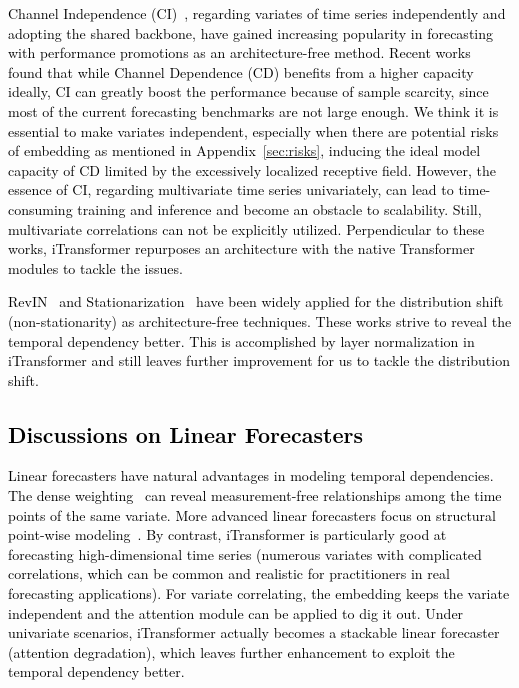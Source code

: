 \documentclass{article} %
\newcommand{\update}[1]{{\textcolor{black}{#1}}}
\begin{document}
\update{Channel Independence (CI)~\citep{PatchTST}, regarding variates of time series independently and adopting the shared backbone, have gained increasing popularity in forecasting with performance promotions as an architecture-free method. Recent works~\citep{han2023capacity, li2023revisiting} found that while Channel Dependence (CD) benefits from a higher capacity ideally, CI can greatly boost the performance because of sample scarcity, since most of the current forecasting benchmarks are not large enough. We think it is essential to make variates independent, especially when there are potential risks of embedding as mentioned in Appendix~\ref{sec:risks}, inducing the ideal model capacity of CD limited by the excessively localized receptive field. However, the essence of CI, regarding multivariate time series univariately, can lead to time-consuming training and inference and become an obstacle to scalability. Still, multivariate correlations can not be explicitly utilized. Perpendicular to these works, iTransformer repurposes an architecture with the native Transformer modules to tackle the issues.}

\update{RevIN~\citep{kim2021reversible} and Stationarization~\citep{Stationary} have been widely applied for the distribution shift (non-stationarity) as architecture-free techniques. These works strive to reveal the temporal dependency better. This is accomplished by layer normalization in iTransformer and still leaves further improvement for us to tackle the distribution shift.}

\subsection{\update{Discussions on Linear Forecasters}}
\update{Linear forecasters have natural advantages in modeling temporal dependencies. The dense weighting~\citep{DLinear, li2023revisiting} can reveal measurement-free relationships among the time points of the same variate. More advanced linear forecasters focus on structural point-wise modeling~\citep{Nbeats, SCINet, liu2023koopa}. By contrast, iTransformer is particularly good at forecasting high-dimensional time series (numerous variates with complicated correlations, which can be common and realistic for practitioners in real forecasting applications). For variate correlating, the embedding keeps the variate independent and the attention module can be applied to dig it out. Under univariate scenarios, iTransformer actually becomes a stackable linear forecaster (attention degradation), which leaves further enhancement to exploit the temporal dependency better.}
\end{document}
